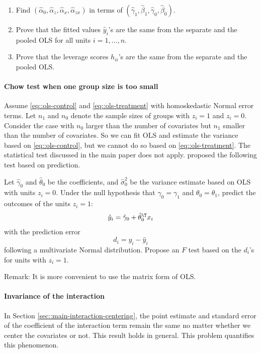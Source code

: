 \begin{enumerate}
\item
Find $(\hat{\alpha}_0, \hat{\alpha}_z, \hat{\alpha}_x, \hat{\alpha}_{zx})$ in terms of $ (  \hat{\gamma}_1, \hat{\beta}_1, \hat{\gamma}_0, \hat{\beta}_0 )$.
\item
Prove that the fitted values $\hat y_i$'s are the same from the separate and the pooled OLS for all units $i=1, \ldots, n$. 
\item
Prove that the leverage scores $h_{ii}$'s are the same from the separate and the pooled OLS. 
\end{enumerate}
 




\paragraph{Chow test when one group size is too small}\label{hw15interaction::chow-small}

Assume \eqref{eq::ols-control} and \eqref{eq::ols-treatment} with homoskedastic Normal error terms. 
Let $n_1$ and $n_0$ denote the sample sizes of groups with $z_i = 1$ and $z_i = 0$. Consider the case with $n_0$ larger than the number of covariates but $n_1$ smaller than the number of covariates. So we can fit OLS and estimate the variance based on \eqref{eq::ols-control}, but we cannot do so based on \eqref{eq::ols-treatment}. The statistical test discussed in the main paper does not apply. \citet{chow1960tests} proposed the following test based on prediction.


Let $\hat{\gamma}_0$ and $\hat{\theta}_0$ be the coefficients, and $\hat{\sigma}^2_0$ be the variance estimate based on OLS with units $z_i = 0$. Under the null hypothesis that   $\gamma_0 = \gamma_1$ and $\theta_0 = \theta_1$,  predict the outcomes of the units $z_i=1$:
$$
\hat{y}_i = \hat{\gamma}_0 + \hat{\theta}_0^{\T} x_i 
$$
with the prediction error
$$
d_i = y_i - \hat{y}_i
$$
following a multivariate Normal distribution. Propose an $F$ test based on the $d_i$'s for units with $z_i = 1$. 


Remark: It is more convenient to use the matrix form of OLS. 


\paragraph{Invariance of the interaction}\label{hw15interaction::2X2-EHW}

In Section \ref{sec::main-interaction-centering}, the point estimate and standard error of the coefficient of the interaction term remain the same no matter whether we center the covariates or not. This result holds in general. This problem quantifies this phenomenon.



